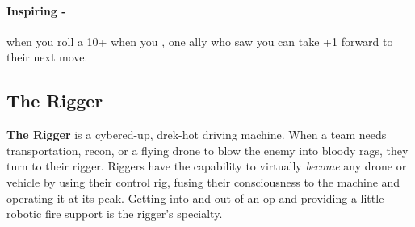 \paragraph{Inspiring -} when you roll a 10+ when you , one ally who saw you can take +1 forward to their next move.




\clearpage
\subsection{The Rigger}
\textbf{The Rigger} is a cybered-up, drek-hot driving machine. When a team needs transportation, recon, or a flying drone to blow the enemy into bloody rags, they turn to their rigger. Riggers have the capability to virtually \textit{become} any drone or vehicle by using their control rig, fusing their consciousness to the machine and operating it at its peak. Getting into and out of an op and providing a little robotic fire support is the rigger’s specialty.

